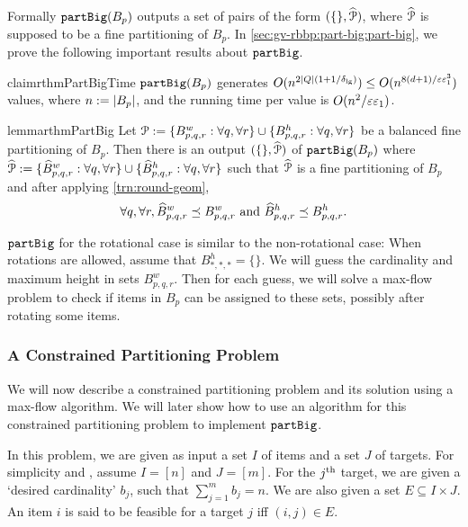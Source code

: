 Formally $\operatorname{\mathtt{partBig}}(B_p)$ outputs a set of pairs of the form $(\{\}, \widehat{\mathcal{P}})$,
where $\widehat{\mathcal{P}}$ is supposed to be a fine partitioning of $B_p$.
In \cref{sec:gv-rbbp:part-big:part-big}, we prove the following important
results about $\operatorname{\mathtt{partBig}}$.

\begin{restatable}{claim}{rthmPartBigTime}
\label{claim:part-big-time}
$\operatorname{\mathtt{partBig}}(B_p)$ generates
$O(n^{2|Q|(1+1/\delta_{\mathrm{lg}})}) \le O(n^{8(d+1)/\varepsilon\varepsilon_1^3})$
values, where $n := |B_p|$, and the running time per value is $O(n^2/\varepsilon\varepsilon_1)$.
\end{restatable}

\begin{restatable}{lemma}{rthmPartBig}
\label{lem:part-big}
Let $\mathcal{P} := \{B^w_{p,q,r}: \forall q, \forall r\} \cup \{B^h_{p,q,r}: \forall q, \forall r\}$
be a balanced fine partitioning of $B_p$.
Then there is an output $(\{\}, \widehat{\mathcal{P}})$ of $\operatorname{\mathtt{partBig}}(B_p)$ where
$\widehat{\mathcal{P}} := \{\widehat{B}^w_{p,q,r}: \forall q, \forall r\}
\cup \{\widehat{B}^h_{p,q,r}: \forall q, \forall r\}$ such that
$\widehat{\mathcal{P}}$ is a fine partitioning of $B_p$ and
after applying \cref{trn:round-geom},
\[ \forall q, \forall r, \widehat{B}^w_{p,q,r} \preceq B^w_{p,q,r}
\textrm{ and } \widehat{B}^h_{p,q,r} \preceq B^h_{p,q,r}. \]
\end{restatable}

$\operatorname{\mathtt{partBig}}$ for the rotational case is similar to the non-rotational case:
When rotations are allowed, assume \wLoG{} that $B^h_{*,*,*} = \{\}$.
We will guess the cardinality and maximum height in sets $B^w_{p,q,r}$.
Then for each guess, we will solve a max-flow problem to check if
items in $B_p$ can be assigned to these sets, possibly after rotating some items.

\subsubsection{A Constrained Partitioning Problem}
\label{sec:gv-rbbp:part-big:cpart}

We will now describe a constrained partitioning problem
and its solution using a max-flow algorithm.
We will later show how to use an algorithm for this constrained partitioning problem
to implement $\operatorname{\mathtt{partBig}}$.

In this problem, we are given as input a set $I$ of items and a set $J$ of targets.
For simplicity and \wLoG, assume $I = [n]$ and $J = [m]$.
For the $j^{\textrm{th}}$ target, we are given a `desired cardinality' $b_j$,
such that $\sum_{j=1}^m b_j = n$.
We are also given a set $E \subseteq I \times J$.
An item $i$ is said to be feasible for a target $j$ iff $(i, j) \in E$.

